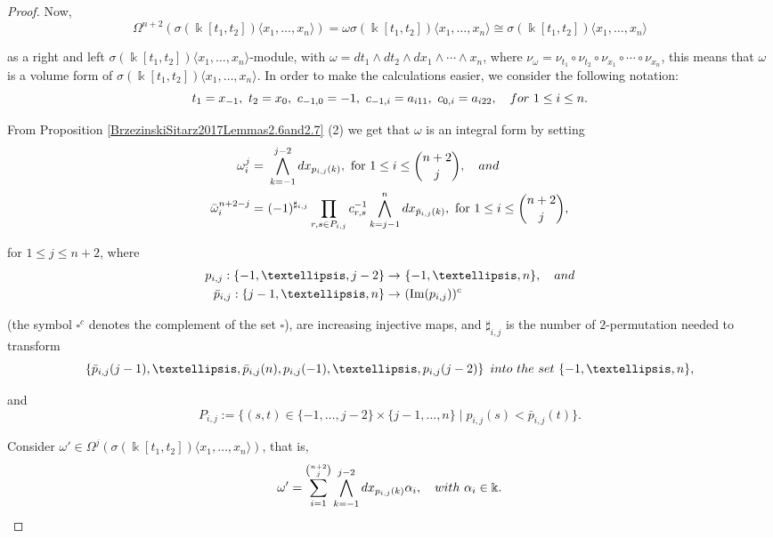 \documentclass{amsart}
\theoremstyle{definition}
\theoremstyle{remark}
\numberwithin{equation}{section}
\begin{document}
\begin{proof}
Now, 
$$
\Omega^{n+2}(\sigma(\Bbbk[t_1, t_2])\langle x_1, \ldots, x_n\rangle) = \omega\sigma(\Bbbk[t_1, t_2])\langle x_1, \ldots, x_n\rangle\cong \sigma(\Bbbk[t_1, t_2])\langle x_1, \ldots, x_n\rangle
$$ 

as a right and left $\sigma(\Bbbk[t_1, t_2])\langle x_1, \ldots, x_n\rangle$-module, with $\omega=dt_1\wedge dt_2 \wedge dx_1 \wedge \cdots \wedge x_n$, where $\nu_{\omega}=\nu_{t_1}\circ\nu_{t_2}\circ\nu_{x_1}\circ\cdots\circ\nu_{x_n}$, this means that $\omega$ is a volume form of $\sigma(\Bbbk[t_1, t_2])\langle x_1, \ldots, x_n\rangle$. In order to make the calculations easier, we consider the following notation:
\[
t_1 = x_{-1}, \ t_2= x_0, \ c_{-1,0} = -1, \  c_{-1,i} = a_{i11}, \ c_{0,i} = a_{i22}, \quad {\rm for}\ 1\le i \le n.
\]

From Proposition \ref{BrzezinskiSitarz2017Lemmas2.6and2.7} (2) we get that $\omega$ is an integral form by setting
\begin{align*}
    \omega_i^j = &\ \bigwedge_{k=-1}^{j-2}dx_{p_{i,j}(k)}, \text{ for } 1\leq i \leq \binom{n+2}{j}, \quad {\rm and} \\
    \bar{\omega}_i^{n+2-j} = &\ (-1)^{\sharp_{i,j}}\prod_{r,s\in P_{i,j}}c_{r,s}^{-1}\bigwedge_{k=j-1}^{n}dx_{\bar{p}_{i,j}(k)}, \text{ for } 1\leq i \leq \binom{n+2}{j},
\end{align*}

for $1\leq j \leq n+2$, where 
\begin{align*}
    p_{i,j}:\{-1,\ldots,j-2\}\rightarrow &\ \{-1,\ldots,n\}, \quad {\rm and} \\
\bar{p}_{i,j}:\{j-1,\ldots,n\}\rightarrow &\ (\text{Im}(p_{i,j}))^c
\end{align*}

(the symbol $\square^c$ denotes the complement of the set $\square$), are increasing injective maps, and $\sharp_{i,j}$ is the number of $2$-permutation needed to transform 
\[
\left\{\bar{p}_{i,j}(j-1),\ldots, \bar{p}_{i,j}(n), p_{i,j}(-1), \ldots, p_{i,j}(j-2)\right\} \ {\rm into\ the\ set} \ \{-1, \ldots, n\},
\]

and 
\[
P_{i,j} :=\{(s, t) \in \{-1, \ldots, j-2\}\times\{j-1, \ldots, n\} \mid p_{i,j}(s)< \bar{p}_{i,j}(t)\}.
\]

Consider $\omega' \in \Omega^j(\sigma(\Bbbk[t_1, t_2])\langle x_1,\ldots, x_n\rangle)$, that is,  
\begin{align*}
\omega' =\sum_{i=1}^{\binom{n+2}{j}}\bigwedge_{k=-1}^{j-2}dx_{p_{i,j}(k)}\alpha_i, \quad {\rm with} \ \alpha_i \in \Bbbk.
\end{align*}


\end{proof}
\end{document}
